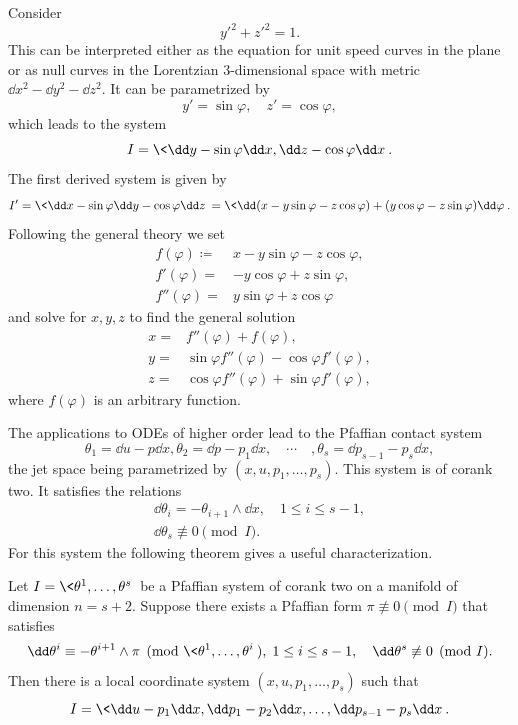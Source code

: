 \begin{example}
    Consider 
    \[y'^2+z'^2=1.\]
    This can be interpreted either as the equation for unit speed curves in the plane or as null curves in the Lorentzian $3$-dimensional space with metric $\dd x^2-\dd y^2-\dd z^2$. It can be parametrized by 
    \[y'=\sin\varphi ,\quad z'=\cos\varphi,\]
    which leads to the system 
    \[I=\<\dd y-\sin\varphi \dd x,\dd z-\cos\varphi \dd x\>.\]
    The first derived system is given by 
    \[I'=\<\dd x-\sin\varphi \dd y-\cos\varphi \dd z\>=\<\dd (x-y\sin\varphi-z\cos\varphi)+(y\cos\varphi-z\sin\varphi)\dd\varphi\>.\]
    Following the general theory we set 
    \begin{align}
        f(\varphi)\coloneqq & x-y\sin\varphi-z\cos\varphi,\\
        f'(\varphi)=&-y\cos\varphi+z\sin\varphi,\\
        f''(\varphi)=&y\sin\varphi+z\cos\varphi
    \end{align} 
    and solve for $x,y,z$ to find the general solution
    \begin{align}
        x=& f''(\varphi)+f(\varphi),\\
        y=& \sin\varphi f''(\varphi)-\cos\varphi f'(\varphi),\\
        z=&\cos\varphi f''(\varphi)+\sin\varphi f'(\varphi),
    \end{align}
    where $f(\varphi)$ is an arbitrary function.
\end{example}

The applications to ODEs of higher order lead to the Pfaffian contact system 
\[\theta_1=\dd u-p\dd x,\theta_2=\dd p-p_1\dd x,\quad\cdots\quad ,\theta_{s}=\dd p_{s-1}-p_s\dd x,\]
the jet space being parametrized by $(x,u,p_1,\ldots,p_s)$. This system is of corank two. It satisfies the relations 
\begin{align}
    \dd \theta_i=-\theta_{i+1}\wedge\dd x,\quad 1\leq i\leq s-1,\\
    \dd \theta_s\not\equiv 0 \pmod{I}.
\end{align}
For this system the following theorem gives a useful characterization.

\begin{thm}\label{thm goursat}
    Let $I=\<\theta^1,\ldots,\theta^s\>$ be a Pfaffian system of corank two on a manifold of dimension $n=s+2$. Suppose there exists a Pfaffian form $\pi\not\equiv 0\pmod{I}$ that satisfies 
    \[\dd\theta^i\equiv -\theta^{i+1}\wedge \pi \pmod{\<\theta^1,\ldots,\theta^i\>},\; 1\leq i\leq s-1,\quad \dd\theta^s\not\equiv 0\pmod{I}.\label{eq 34 Bryant}\]
    Then there is a local coordinate system $(x,u,p_1,\ldots,p_s)$ such that 
    \[I=\<\dd u-p_1 \dd x,\dd p_1-p_2\dd x,\ldots, \dd p_{s-1}-p_s\dd x\>.\]
\end{thm}

